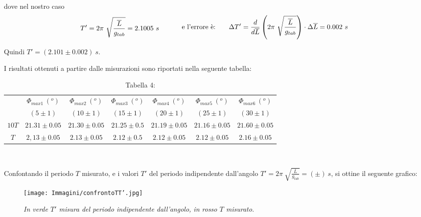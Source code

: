 \documentclass[12pt, a4paper]{article}
\begin{document}
dove nel nostro caso
\begin{equation*}
\begin{aligned}
  & & \displaystyle T'=2\pi\ \sqrt{\frac{\overline{L}}{g_{tab}}}=2.1005\ s
  &\quad{} 
  \end{aligned}
  \begin{aligned}
  & &\text{ e l'errore è:\phantom{.......}} \Delta T'=\frac{d}{d\overline{L}}\left( 2\pi\ \sqrt{\frac{\overline{L}}{g_{tab}}}\right)\cdot\Delta\overline{L}=0.002\ s
  &
  \end{aligned}
\end{equation*}
\bigskip

Quindi $T'=(2.101\pm 0.002)\ s$.


\addvspace{3cm}
I risultati ottenuti a partire dalle misurazioni sono riportati nella seguente tabella:

\begin{table}[ht] 
\centering
\begin{tabular}{|c|c|c|c|c|c|c|} 

 \hline
  &$\Phi_{max1}\ (^o)$ & $\Phi_{max2}\ (^o)$ & $\Phi_{max3}\ (^o)$ & $\Phi_{max4}\ (^o)$ & $\Phi_{max5}\ (^o)$ & $\Phi_{max6}\ (^o)$  \\
    &$(5\pm1)$ & $(10\pm1)$ & $(15\pm1)$ & $(20\pm1)$ & $(25\pm1)$ & $(30\pm1)$  \\
\hline

  $10T$& $21.31\pm 0.05 $&$21.30\pm0.05$&$21.25\pm0.5$&$21.19\pm0.05$ &$21.16\pm0.05$&$21.60\pm 0.05$\\
\hline
 $T$& $2,13\pm 0.05 $&$2.13\pm0.05$&$2.12\pm0.5$&$2.12\pm0.05$ &$2.12\pm0.05$&$2.16\pm 0.05$\\
\hline

\end{tabular}\\
\caption*{\centering Tabella 4:\small{\textit{ } }}
    \label{tab T indip Angolo}
\end{table}


\newpage

Confontando il periodo $T$ misurato, e i valori $T'$ del periodo indipendente dall'angolo $\displaystyle T'=2\pi\ \sqrt{\frac{\overline{L}}{g_{tab}}}=(\pm)\ s$, si ottine il seguente grafico:



    \begin{figure}[h!]
\centering
\texttt{[image: Immagini/confrontoTT'.jpg]}
\caption{\textit{{\footnotesize{In verde $T'$ misura del periodo indipendente dall'angolo, in rosso $T$ misurato.  }}}}
\label{confrontoTT'}
\end{figure}
\end{document}
